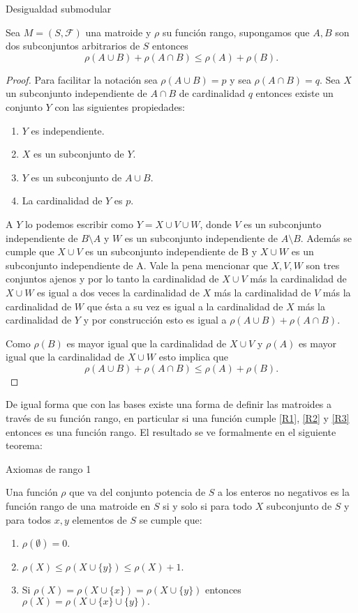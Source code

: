 \begin{cor} {Desigualdad submodular} \label {R3'}

Sea $M=(S,\mathcal{F})$ una matroide y $\rho$ su función rango, supongamos que $A,B$ son dos subconjuntos arbitrarios de $S$ entonces
$$\rho(A \cup B)+ \rho(A \cap B) \leq \rho(A) + \rho(B).$$
\end{cor}

\begin{proof}
Para facilitar la notación sea $\rho(A \cup B)=p$ y sea $\rho(A \cap B) =q$. Sea $X$ un subconjunto independiente de $A \cap B$ de cardinalidad $q$ entonces existe un conjunto $Y$ con las siguientes propiedades:
\begin{enumerate}
\item $Y$ es independiente.
\item $X$ es un subconjunto de $Y$.
\item $Y$ es un subconjunto de $A \cup B$.
\item La cardinalidad de $Y$ es $p$.
\end{enumerate}
A $Y$ lo podemos escribir como $Y=X \cup V \cup W$, donde $V$ es un subconjunto independiente de $B \setminus A$ y $W$ es un subconjunto independiente de $A \setminus B$. Además se cumple que $X \cup V$ es un subconjunto independiente de B y $X \cup W$ es un subconjunto independiente de A. Vale la pena mencionar que $X, V,W$ son tres conjuntos ajenos y por lo tanto la cardinalidad de $X \cup V$ más la cardinalidad de $X \cup W$ es igual a dos veces la cardinalidad de $X$ más la cardinalidad de $V$ más la cardinalidad de $W$ que ésta a su vez es igual a la cardinalidad de $X$ más la cardinalidad de $Y$ y por construcción esto es igual a $\rho(A \cup B)+ \rho(A \cap B)$. 

Como $\rho(B)$ es mayor igual que la cardinalidad de $X \cup V$ y $\rho(A)$ es mayor igual que la cardinalidad de $X \cup W$ esto implica que 
$$\rho(A \cup B)+ \rho(A \cap B) \leq \rho(A) + \rho(B).$$
\end{proof}

De igual forma que con las bases existe una forma de definir las matroides a través de su función rango, en particular si una función cumple \ref{R1}, \ref{R2} y \ref{R3} entonces es una función rango. El resultado se ve formalmente en el siguiente teorema:

\begin{teo}{Axiomas de rango 1} \label{rank 1}

Una función $\rho$ que va del conjunto potencia de $S$ a los enteros no negativos es la función rango de una matroide en $S$ si y solo si para todo $X$ subconjunto de $S$ y para todos $x,y$ elementos de $S$ se cumple que:
\begin{enumerate}
\item $\rho(\emptyset) =0.$
\item $\rho(X) \leq \rho(X \cup \{y\}) \leq \rho(X)+1.$
\item Si $\rho(X)=\rho(X \cup \{ x\}) =\rho(X \cup \{ y\}) $ entonces $\rho(X)=\rho(X \cup \{ x\} \cup \{ y\}).$
\end{enumerate}
\end{teo}

